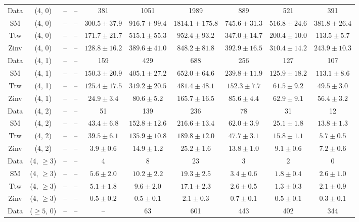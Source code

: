 \begin{table}[h!]
{\begin{tabular}{cccccccccc}
	Data & (4, 0) & -- & -- & 381 & 1051 & 1989 & 889 & 521 & 391 \\[0.5ex] 
	SM & (4, 0) & -- & -- & $300.5\pm 37.9$ & $916.7\pm 99.4$ & $1814.1\pm 175.8$ & $745.6\pm 31.3$ & $516.8\pm 24.6$ & $381.8\pm 26.4$ \\[0.5ex] 
	Ttw & (4, 0) & -- & -- & $171.7\pm 21.7$ & $515.1\pm 55.3$ & $952.4\pm 93.2$ & $347.0\pm 14.7$ & $200.4\pm 10.0$ & $113.5\pm 5.7$ \\[0.5ex] 
	Zinv & (4, 0) & -- & -- & $128.8\pm 16.2$ & $389.6\pm 41.0$ & $848.2\pm 81.8$ & $392.9\pm 16.5$ & $310.4\pm 14.2$ & $243.9\pm 10.3$ \\[0.5ex] 
	Data & (4, 1) & -- & -- & 159 & 429 & 688 & 256 & 127 & 107 \\[0.5ex] 
	SM & (4, 1) & -- & -- & $150.3\pm 20.9$ & $405.1\pm 27.2$ & $652.0\pm 64.6$ & $239.8\pm 11.9$ & $125.9\pm 18.2$ & $113.1\pm 8.6$ \\[0.5ex] 
	Ttw & (4, 1) & -- & -- & $125.4\pm 17.5$ & $319.2\pm 20.5$ & $481.4\pm 48.1$ & $152.3\pm 7.7$ & $61.5\pm 9.2$ & $49.5\pm 3.0$ \\[0.5ex] 
	Zinv & (4, 1) & -- & -- & $24.9\pm 3.4$ & $80.6\pm 5.2$ & $165.7\pm 16.5$ & $85.6\pm 4.4$ & $62.9\pm 9.1$ & $56.4\pm 3.2$ \\[0.5ex] 
	Data & (4, 2) & -- & -- & 51 & 139 & 236 & 78 & 31 & 12 \\[0.5ex] 
	SM & (4, 2) & -- & -- & $43.4\pm 6.8$ & $152.8\pm 12.6$ & $216.6\pm 13.4$ & $62.0\pm 3.9$ & $25.1\pm 1.8$ & $13.8\pm 1.3$ \\[0.5ex] 
	Ttw & (4, 2) & -- & -- & $39.5\pm 6.1$ & $135.9\pm 10.8$ & $189.8\pm 12.0$ & $47.7\pm 3.1$ & $15.8\pm 1.1$ & $5.7\pm 0.5$ \\[0.5ex] 
	Zinv & (4, 2) & -- & -- & $3.9\pm 0.6$ & $14.9\pm 1.2$ & $25.2\pm 1.6$ & $13.8\pm 1.0$ & $9.1\pm 0.6$ & $7.2\pm 0.6$ \\[0.5ex] 
	Data & (4, $\ge3$) & -- & -- & 4 & 8 & 23 & 3 & 2 & 0 \\[0.5ex] 
	SM & (4, $\ge3$) & -- & -- & $5.6\pm 2.0$ & $10.2\pm 2.2$ & $19.3\pm 2.5$ & $3.4\pm 0.6$ & $1.8\pm 0.4$ & $2.6\pm 1.0$ \\[0.5ex] 
	Ttw & (4, $\ge3$) & -- & -- & $5.1\pm 1.8$ & $9.6\pm 2.0$ & $17.1\pm 2.3$ & $2.6\pm 0.5$ & $1.3\pm 0.3$ & $2.1\pm 0.9$ \\[0.5ex] 
	Zinv & (4, $\ge3$) & -- & -- & $0.5\pm 0.2$ & $0.5\pm 0.1$ & $2.1\pm 0.3$ & $0.7\pm 0.1$ & $0.5\pm 0.1$ & $0.3\pm 0.1$ \\[0.5ex] 
	Data & ($\ge5$, 0) & -- & -- & -- & 63 & 601 & 443 & 402 & 344 \\[0.5ex] 

\end{tabular}}
\end{table}
